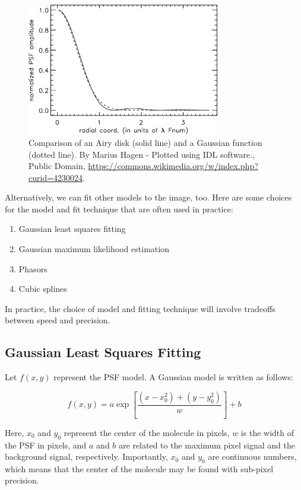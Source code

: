 \documentclass[10pt,a4paper,oneside]{book}
\begin{document}
\begin{figure}[ht]
    \centering
    \includegraphics[width=0.75\textwidth]{Airy_vs_gaus.png}
    \caption{Comparison of an Airy disk (solid line) and a Gaussian function (dotted line). By Marius Hagen - Plotted using IDL software., Public Domain, \url{https://commons.wikimedia.org/w/index.php?curid=4230024}.}
    \label{fig:airy-vs-gauss}
\end{figure}

Alternatively, we can fit other models to the image, too. Here are some choices for the model and fit technique that are often used in practice:

\begin{enumerate}
    \item Gaussian least squares fitting
    \item Gaussian maximum likelihood estimation
    \item Phasors
    \item Cubic splines
\end{enumerate}

In practice, the choice of model and fitting technique will involve tradeoffs between speed and precision.

\subsection{Gaussian Least Squares Fitting}

Let $f \left(x, y\right)$ represent the PSF model. A Gaussian model is written as follows:

\begin{equation}
    f \left(x, y\right) = a \exp \left[ \frac{\left(x-x_{0}^2\right) + \left(y - y_{0}^2\right)}{w} \right] + b
\end{equation}

\noindent Here, $x_0$ and $y_0$ represent the center of the molecule in pixels, $w$ is the width of the PSF in pixels, and $a$ and $b$ are related to the maximum pixel signal and the background signal, respectively. Importantly, $x_0$ and $y_0$ are continuous numbers, which means that the center of the molecule may be found with sub-pixel precision.
\end{document}
